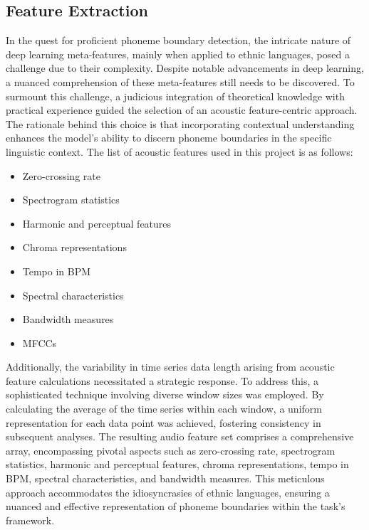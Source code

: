 \documentclass{article}
\begin{document}
\subsection{Feature Extraction}
In the quest for proficient phoneme boundary detection, the intricate nature of deep learning meta-features, mainly when applied to ethnic languages, posed a challenge due to their complexity. Despite notable advancements in deep learning, a nuanced comprehension of these meta-features still needs to be discovered. To surmount this challenge, a judicious integration of theoretical knowledge with practical experience guided the selection of an acoustic feature-centric approach. The rationale behind this choice is that incorporating contextual understanding enhances the model's ability to discern phoneme boundaries in the specific linguistic context. The list of acoustic features used in this project is as follows:
\begin{itemize}
    \item Zero-crossing rate
    \item Spectrogram statistics
    \item Harmonic and perceptual features
    \item Chroma representations
    \item Tempo in BPM
    \item Spectral characteristics
    \item Bandwidth measures
    \item MFCCs
\end{itemize}
Additionally, the variability in time series data length arising from acoustic feature calculations necessitated a strategic response. To address this, a sophisticated technique involving diverse window sizes was employed. By calculating the average of the time series within each window, a uniform representation for each data point was achieved, fostering consistency in subsequent analyses. The resulting audio feature set comprises a comprehensive array, encompassing pivotal aspects such as zero-crossing rate, spectrogram statistics, harmonic and perceptual features, chroma representations, tempo in BPM, spectral characteristics, and bandwidth measures. This meticulous approach accommodates the idiosyncrasies of ethnic languages, ensuring a nuanced and effective representation of phoneme boundaries within the task's framework.
\end{document}
